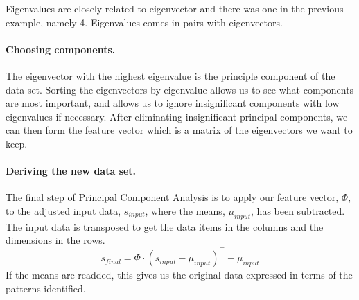 Eigenvalues are closely related to eigenvector and there was one in the previous example, namely 4.
Eigenvalues comes in pairs with eigenvectors.

\paragraph{Choosing components.}
The eigenvector with the highest eigenvalue is the principle component of the data set.
Sorting the eigenvectors by eigenvalue allows us to see what components are most important, and allows us to ignore insignificant components with low eigenvalues if necessary.
After eliminating insignificant principal components, we can then form the feature vector which is a matrix of the eigenvectors we want to keep.


\paragraph{Deriving the new data set.}
The final step of Principal Component Analysis is to apply our feature vector, $\Phi$, to the adjusted input data, $s_{input}$, where the means, $\mu_{input}$, has been subtracted.
The input data is transposed to get the data items in the columns and the dimensions in the rows.
$$s_{final} = \Phi\cdot (s_{input}-\mu_{input})^\top+\mu_{input} $$ %
If the means are readded, this gives us the original data expressed in terms of the patterns identified.

